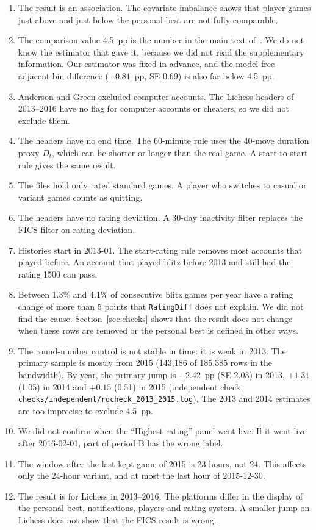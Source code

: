\documentclass[11pt]{article}
\begin{document}
\begin{enumerate}
\item The result is an association. The covariate imbalance shows that player-games just above and just below the personal best are not fully comparable.
\item The comparison value 4.5~pp is the number in the main text of~\cite{ag}. We do not know the estimator that gave it, because we did not read the supplementary information. Our estimator was fixed in advance, and the model-free adjacent-bin difference ($+0.81$~pp, SE 0.69) is also far below 4.5~pp.
\item Anderson and Green excluded computer accounts. The Lichess headers of 2013--2016 have no flag for computer accounts or cheaters, so we did not exclude them.
\item The headers have no end time. The 60-minute rule uses the 40-move duration proxy $D_t$, which can be shorter or longer than the real game. A start-to-start rule gives the same result.
\item The files hold only rated standard games. A player who switches to casual or variant games counts as quitting.
\item The headers have no rating deviation. A 30-day inactivity filter replaces the FICS filter on rating deviation.
\item Histories start in 2013-01. The start-rating rule removes most accounts that played before. An account that played blitz before 2013 and still had the rating 1500 can pass.
\item Between 1.3\% and 4.1\% of consecutive blitz games per year have a rating change of more than 5 points that \texttt{RatingDiff} does not explain. We did not find the cause. Section~\ref{sec:checks} shows that the result does not change when these rows are removed or the personal best is defined in other ways.
\item The round-number control is not stable in time: it is weak in 2013. The primary sample is mostly from 2015 (143,186 of 185,385 rows in the bandwidth). By year, the primary jump is $+2.42$~pp (SE 2.03) in 2013, $+1.31$ (1.05) in 2014 and $+0.15$ (0.51) in 2015 (independent check, \texttt{checks/independent/rdcheck\_2013\_2015.log}). The 2013 and 2014 estimates are too imprecise to exclude 4.5~pp.
\item We did not confirm when the ``Highest rating'' panel went live. If it went live after 2016-02-01, part of period B has the wrong label.
\item The window after the last kept game of 2015 is 23 hours, not 24. This affects only the 24-hour variant, and at most the last hour of 2015-12-30.
\item The result is for Lichess in 2013--2016. The platforms differ in the display of the personal best, notifications, players and rating system. A smaller jump on Lichess does not show that the FICS result is wrong.
\end{enumerate}
\end{document}
